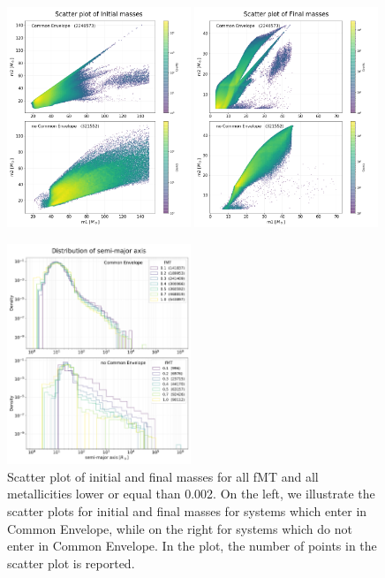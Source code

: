 \documentclass[prb,twocolumn,9pt]{revtex4-1}
\begin{document}
\begin{figure}[h!]
\centering 
    \begin{minipage}[c]{2.0\columnwidth}
    \centering 
    \includegraphics[width=0.49\textwidth]{images/assignment2_1/scatterInitial_masses.png} 
    \hskip 1mm
   \includegraphics[width=0.49\textwidth]{images/assignment2_1/scatterFinal_masses.png}
    \caption{Scatter plot of initial and final masses for all fMT and all metallicities lower or equal than 0.002.
    On the left, we illustrate the scatter plots for initial and final masses for systems which enter in Common Envelope, while on the right for systems which do not enter in Common Envelope. 
    In the plot, the number of points in the scatter plot is reported. }
    \label{fig:ass2_1_scatterplot}
    \end{minipage}
    \vskip 0.3cm
    \centering 
    \begin{minipage}[c]{2.0\columnwidth}
    \includegraphics[width=0.49\textwidth]{images/assignment2_1/hist_sep_fMT.pdf}

\end{minipage}
\end{figure}
\end{document}
